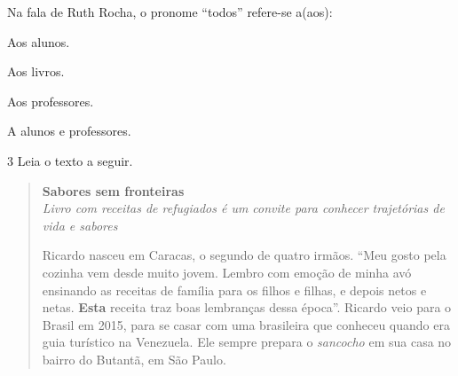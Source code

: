 \noindent Na fala de Ruth Rocha, o pronome ``todos'' refere-se a(aos):

\begin{escolha}
\item Aos alunos.
\item Aos livros.
\item Aos professores.
\item A alunos e professores.
\end{escolha}



\num{3} Leia o texto a seguir.

\begin{quote}
\centering\noindent \textbf{Sabores sem fronteiras}\\

\noindent \emph{Livro com receitas de refugiados é um convite para conhecer
trajetórias de vida e sabores}\\
\medskip

\noindent Ricardo nasceu em Caracas, o segundo de quatro irmãos. ``Meu gosto pela
cozinha vem desde muito jovem. Lembro com emoção de minha avó ensinando
as receitas de família para os filhos e filhas, e depois netos e netas.
\textbf{Esta} receita traz boas lembranças dessa época''. Ricardo veio
para o Brasil em 2015, para se casar com uma brasileira que conheceu
quando era guia turístico na Venezuela. Ele sempre prepara o
\emph{sancocho} em sua casa no bairro do Butantã, em São Paulo.

\end{quote}

